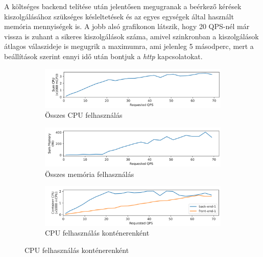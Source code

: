 A költséges backend telítése után jelentősen megugranak a beérkező kérések kiszolgálásához szükséges késleltetések és az egyes egységek által használt memória mennyiségek is.
A jobb alsó grafikonon látszik, hogy 20 QPS-nél már vissza is zuhant a sikeres kiszolgálások száma, amivel szinkronban a kiszolgálások átlagos válaszideje is megugrik a maximumra, ami jelenleg 5 másodperc, mert a beállítások szerint ennyi idő után bontjuk a \textit{http} kapcsolatokat.



\begin{figure}
\centering
\begin{subfigure}{\textwidth}
    \includegraphics[width=\textwidth]{figures/3FE-1BE-stack/sum-cpu.png}
    \caption{Összes CPU felhasználás}
    \label{subfig:stack-sum-cpu}
\end{subfigure}

\hfill
\begin{subfigure}{\textwidth}
    \includegraphics[width=\textwidth]{figures/3FE-1BE-stack/sum-mem.png}
    \caption{Összes memória felhasználás}
    \label{subfig:stack-sum-mem}
\end{subfigure}

\hfill
\begin{subfigure}{\textwidth}
    \includegraphics[width=\textwidth]{figures/3FE-1BE-stack/container-cpu.png}
    \caption{CPU felhasználás konténerenként}
    \label{subfig:stack-container-cpu}
\end{subfigure}


\end{figure}
